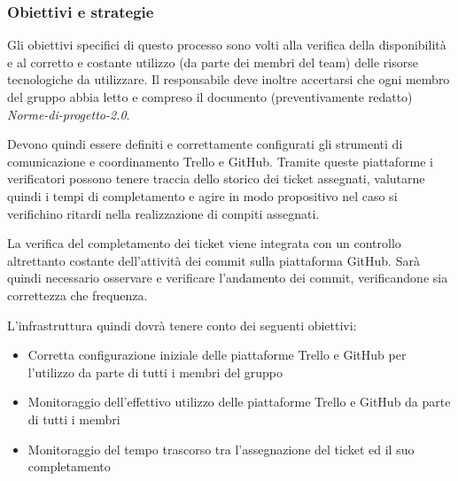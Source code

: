 \documentclass[a4paper,11pt]{article}
\begin{document}
\begin{itemize}
\subsubsection{Obiettivi e strategie}
Gli obiettivi specifici di questo processo sono volti alla verifica della disponibilità e al corretto e costante utilizzo (da parte dei membri del team) delle risorse tecnologiche da utilizzare. 
Il responsabile deve inoltre accertarsi che ogni membro del gruppo abbia letto e compreso il documento (preventivamente redatto) \textit{Norme-di-progetto-2.0}.

Devono quindi essere definiti e correttamente configurati gli strumenti di comunicazione e coordinamento Trello e GitHub. Tramite queste piattaforme i verificatori possono tenere traccia dello storico dei ticket assegnati, valutarne quindi i tempi di completamento e agire in modo propositivo nel caso si verifichino ritardi nella realizzazione di compiti assegnati.

La verifica del completamento dei ticket viene integrata con un controllo altrettanto costante dell'attività dei commit sulla piattaforma GitHub. Sarà quindi necessario osservare e verificare l'andamento dei commit, verificandone sia correttezza che frequenza.

L'infrastruttura quindi dovrà tenere conto dei seguenti obiettivi:
\begin{itemize}
\item Corretta configurazione iniziale delle piattaforme Trello e GitHub per l'utilizzo da parte di tutti i membri del gruppo
\item Monitoraggio dell'effettivo utilizzo delle piattaforme Trello e GitHub da parte di tutti i membri
\item Monitoraggio del tempo trascorso tra l'assegnazione del ticket ed il suo completamento
\end{itemize} 


\end{itemize}
\end{document}
